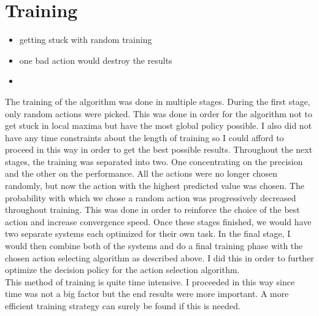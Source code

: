 \section{Training}
\begin{itemize}
	\item getting stuck with random training
	\item one bad action would destroy the results
	\item 
\end{itemize}
The training of the algorithm was done in multiple stages. During the first stage, only random actions were picked. This was done in order for the algorithm not to get stuck in local maxima but have the most global policy possible. I also did not have any time constraints about the length of training so I could afford to proceed in this way in order to get the best possible results. Throughout the next stages, the training was separated into two. One concentrating on the precision and the other on the performance. All the actions were no longer chosen randomly, but now the action with the highest predicted value was chosen. The probability with which we chose a random action was progressively decreased throughout training. This was done in order to reinforce the choice of the best action and increase convergence speed. Once these stages finished, we would have two separate systems each optimized for their own task. In the final stage, I would then combine both of the systems and do a final training phase with the chosen action selecting algorithm as described above. I did this in order to further optimize the decision policy for the action selection algorithm.\\
This method of training is quite time intensive. I proceeded in this way since time was not a big factor but the end results were more important. A more efficient training strategy can surely be found if this is needed.

